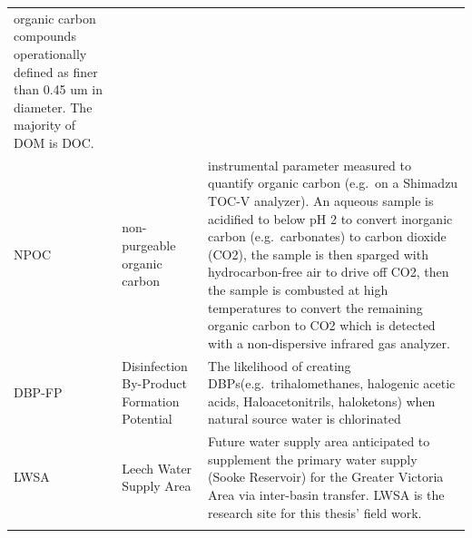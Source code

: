 \documentclass[]{article}
\begin{document}
\begin{longtable}[]{@{}lll@{}}
\begin{minipage}[t]{0.16\columnwidth}
organic carbon compounds operationally defined as finer than 0.45 um in
diameter. The majority of DOM is DOC.\strut
\end{minipage}\tabularnewline
\begin{minipage}[t]{0.11\columnwidth}\raggedright\strut
NPOC\strut
\end{minipage} & \begin{minipage}[t]{0.09\columnwidth}\raggedright\strut
non-purgeable organic carbon\strut
\end{minipage} & \begin{minipage}[t]{0.16\columnwidth}\raggedright\strut
instrumental parameter measured to quantify organic carbon (e.g.~on a
Shimadzu TOC-V analyzer). An aqueous sample is acidified to below pH 2
to convert inorganic carbon (e.g.~carbonates) to carbon dioxide (CO2),
the sample is then sparged with hydrocarbon-free air to drive off CO2,
then the sample is combusted at high temperatures to convert the
remaining organic carbon to CO2 which is detected with a non-dispersive
infrared gas analyzer.\strut
\end{minipage}\tabularnewline
\begin{minipage}[t]{0.11\columnwidth}\raggedright\strut
DBP-FP\strut
\end{minipage} & \begin{minipage}[t]{0.09\columnwidth}\raggedright\strut
Disinfection By-Product Formation Potential\strut
\end{minipage} & \begin{minipage}[t]{0.16\columnwidth}\raggedright\strut
The likelihood of creating DBPs(e.g.~trihalomethanes, halogenic acetic
acids, Haloacetonitrils, haloketons) when natural source water is
chlorinated\strut
\end{minipage}\tabularnewline
\begin{minipage}[t]{0.11\columnwidth}\raggedright\strut
LWSA\strut
\end{minipage} & \begin{minipage}[t]{0.09\columnwidth}\raggedright\strut
Leech Water Supply Area\strut
\end{minipage} & \begin{minipage}[t]{0.16\columnwidth}\raggedright\strut
Future water supply area anticipated to supplement the primary water
supply (Sooke Reservoir) for the Greater Victoria Area via inter-basin
transfer. LWSA is the research site for this thesis' field work.\strut
\end{minipage}\tabularnewline
\begin{minipage}[t]{0.11\columnwidth}\raggedright\strut

\end{minipage}
\end{longtable}
\end{document}
